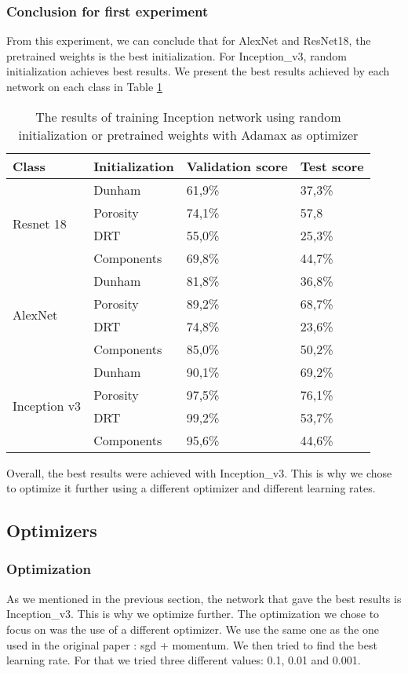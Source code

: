 \subsubsection{Conclusion for first experiment}
From this experiment, we can conclude that for AlexNet and ResNet18, the pretrained weights is the best initialization. For Inception\_v3, random initialization achieves best results. We present the best results achieved by each network on each class in Table \ref{tab:finalinit}
\begin{table}
\caption{\label{tab:finalinit} The results of training Inception network using random initialization or pretrained weights with Adamax as optimizer}
\centering
\begin{tabular}[b]{| l |  l | l | l |}
\hline
    Class & Initialization & Validation score  & Test score\\ \hline
    \multirow{4}{*}{Resnet 18} & Dunham &  61,9\%  & 37,3\% \\ 
    & Porosity & 74,1\% &  57,8\\
    &DRT & 55,0\% &  25,3\% \\
    &Components & 69,8\% &  44,7\% \\ \hline
     \multirow{4}{*}{AlexNet} & Dunham &  81,8\% & 36,8\% \\
    & Porosity & 89,2\% &  68,7\% \\
    &DRT & 74,8\% &   23,6\% \\
    &Components & 85,0\% & 50,2\% \\ \hline
    \multirow{4}{*}{Inception v3} & Dunham &  90,1\% & 69,2\% \\
    & Porosity & 97,5\% &  76,1\% \\
    &DRT & 99,2\% &  53,7\% \\
    &Components & 95,6\% & 44,6\% \\ \hline
\end{tabular} 
\end{table}

Overall, the best results were achieved with Inception\_v3. This is why we chose to optimize it further using a different optimizer and different learning rates. 


\subsection{Optimizers}
\subsubsection{Optimization}
As we mentioned in the previous section, the network that gave the best results is Inception\_v3.
This is why we optimize further. The optimization we chose to focus on was the use of a different optimizer. We use the same one as the one used in the original paper \cite{googlepaper}: \gls{sgd} + momentum. We then tried to find the best learning rate. For that we tried three different values: 0.1, 0.01 and 0.001.

